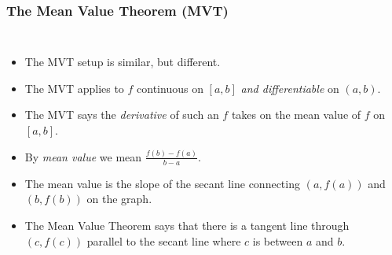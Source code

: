 \documentclass[serif,ignorenonframetext]{beamer}
\newcommand{\ds}{\displaystyle}
\begin{document}
\begin{frame}
  \frametitle{The Mean Value Theorem (MVT)}
  \begin{columns}
  \begin{itemize}[<+->]
  \item The MVT setup is similar, but different.
  \item The MVT applies to $f$ continuous on $[a,b]$
    \textit{and differentiable} on $(a,b)$.
  \item The MVT says the \textit{derivative} of such an $f$
    takes on the mean value of $f$ on $[a,b]$.
  \item By \textit{mean value} we mean $\ds \frac{f(b)-f(a)}{b-a}$.
  \item The mean value is the slope of the secant line connecting
    $(a,f(a))$ and $(b,f(b))$ on the graph.
  \item The Mean Value Theorem says that there is a tangent line through
    $(c,f(c))$ parallel to the secant line where $c$ is between $a$ and $b$.
  \end{itemize}

\end{columns}
\end{frame}
\end{document}
